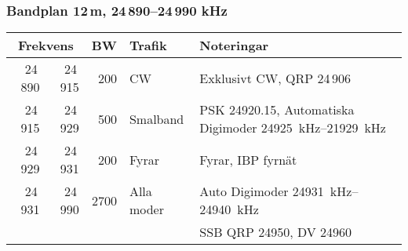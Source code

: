 \subsubsection{Bandplan 12\,m, 24\,890--24\,990 kHz}
\begin{tabular}{rrrll}
\multicolumn{2}{c}{\textbf{Frekvens}} & \textbf{BW} & \textbf{Trafik} & \textbf{Noteringar} \\ \hline

24\,890 & 24\,915 & 200  & CW         & Exklusivt CW, QRP 24\,906                  \\ \hline
24\,915 & 24\,929 & 500  & Smalband   & PSK \num{24920,15}, Automatiska
                                        Digimoder \SIrange{24925}{21929}{kHz}      \\ \hline
24\,929 & 24\,931 & 200  & Fyrar      & Fyrar, IBP fyrnät                          \\ \hline
24\,931 & 24\,990 & 2700 & Alla moder & Auto Digimoder \SIrange{24931}{24940}{kHz} \\
        &         &      &            & SSB QRP \num{24950}, DV \num{24960}{}      \\ \hline
\end{tabular}

